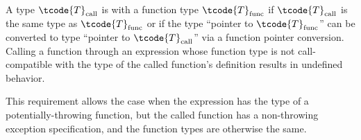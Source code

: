 \pnum
A type $\tcode{T}_\text{call}$ is
 with a function type $\tcode{T}_\text{func}$
if $\tcode{T}_\text{call}$ is the same type as $\tcode{T}_\text{func}$ or
if the type ``pointer to $\tcode{T}_\text{func}$'' can be
converted to type ``pointer to $\tcode{T}_\text{call}$''
via a function pointer conversion.
Calling a function through an
expression whose function type
is not call-compatible with the
type of the called function's
definition results in undefined behavior.
%
%
%
%
%
\begin{note}
This requirement allows the case
when the expression has the type of a
potentially-throwing function, but the called function has
a non-throwing exception specification,
and the function types are otherwise the same.
\end{note}

